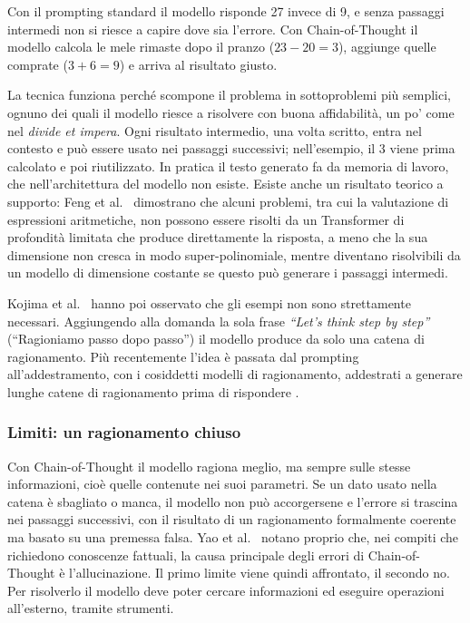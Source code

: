 Con il prompting standard il modello risponde 27 invece di 9, e senza passaggi intermedi non si riesce a capire dove sia l'errore. Con Chain-of-Thought il modello calcola le mele rimaste dopo il pranzo ($23 - 20 = 3$), aggiunge quelle comprate ($3 + 6 = 9$) e arriva al risultato giusto.

La tecnica funziona perché scompone il problema in sottoproblemi più semplici, ognuno dei quali il modello riesce a risolvere con buona affidabilità, un po' come nel \emph{divide et impera}. Ogni risultato intermedio, una volta scritto, entra nel contesto e può essere usato nei passaggi successivi; nell'esempio, il 3 viene prima calcolato e poi riutilizzato. In pratica il testo generato fa da memoria di lavoro, che nell'architettura del modello non esiste. Esiste anche un risultato teorico a supporto: Feng et al.\ \cite{feng2023cot} dimostrano che alcuni problemi, tra cui la valutazione di espressioni aritmetiche, non possono essere risolti da un Transformer di profondità limitata che produce direttamente la risposta, a meno che la sua dimensione non cresca in modo super-polinomiale, mentre diventano risolvibili da un modello di dimensione costante se questo può generare i passaggi intermedi.

Kojima et al.\ \cite{kojima2022zeroshot} hanno poi osservato che gli esempi non sono strettamente necessari. Aggiungendo alla domanda la sola frase \emph{``Let's think step by step''} (``Ragioniamo passo dopo passo'') il modello produce da solo una catena di ragionamento. Più recentemente l'idea è passata dal prompting all'addestramento, con i cosiddetti modelli di ragionamento, addestrati a generare lunghe catene di ragionamento prima di rispondere \cite{deepseek2025r1}.

\subsubsection{Limiti: un ragionamento chiuso}

Con Chain-of-Thought il modello ragiona meglio, ma sempre sulle stesse informazioni, cioè quelle contenute nei suoi parametri. Se un dato usato nella catena è sbagliato o manca, il modello non può accorgersene e l'errore si trascina nei passaggi successivi, con il risultato di un ragionamento formalmente coerente ma basato su una premessa falsa. Yao et al.\ \cite{yao2023react} notano proprio che, nei compiti che richiedono conoscenze fattuali, la causa principale degli errori di Chain-of-Thought è l'allucinazione. Il primo limite viene quindi affrontato, il secondo no. Per risolverlo il modello deve poter cercare informazioni ed eseguire operazioni all'esterno, tramite strumenti.

